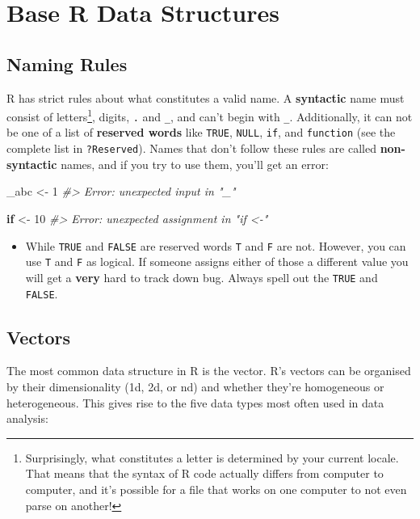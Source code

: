 \documentclass[]{book}
\newenvironment{Shaded}{\begin{snugshade}}{\end{snugshade}}
\newcommand{\DecValTok}[1]{\textcolor[rgb]{0.00,0.00,0.81}{#1}}
\newcommand{\StringTok}[1]{\textcolor[rgb]{0.31,0.60,0.02}{#1}}
\newcommand{\CommentTok}[1]{\textcolor[rgb]{0.56,0.35,0.01}{\textit{#1}}}
\newcommand{\ControlFlowTok}[1]{\textcolor[rgb]{0.13,0.29,0.53}{\textbf{#1}}}
\newcommand{\NormalTok}[1]{#1}
\let\rmarkdownfootnote\footnote%
\def\footnote{\protect\rmarkdownfootnote}
\newenvironment{rmdblock}[1]
  {\begin{shaded*}
  \begin{itemize}
  \renewcommand{\labelitemi}{
    \raisebox{-.7\height}[0pt][0pt]{
      {\setkeys{Gin}{width=3em,keepaspectratio}\texttt{[image: images/\#1]}}
    }
  }
  \item
  }
  {
  \end{itemize}
  \end{shaded*}
  }
\newenvironment{rmdwarning}
  {\begin{rmdblock}{warning}}
  {\end{rmdblock}}
\theoremstyle{definition}
\theoremstyle{definition}
\theoremstyle{definition}
\theoremstyle{remark}
\begin{document}
\chapter{Base R Data Structures}\label{base-r-data-structures}

\section{Naming Rules}\label{naming-rules}

R has strict rules about what constitutes a valid name. A
\textbf{syntactic} name must consist of letters\footnote{Surprisingly,
  what constitutes a letter is determined by your current locale. That
  means that the syntax of R code actually differs from computer to
  computer, and it's possible for a file that works on one computer to
  not even parse on another!}, digits, \texttt{.} and \texttt{\_}, and
can't begin with \texttt{\_}. Additionally, it can not be one of a list
of \textbf{reserved words} like \texttt{TRUE}, \texttt{NULL},
\texttt{if}, and \texttt{function} (see the complete list in
\texttt{?Reserved}). Names that don't follow these rules are called
\textbf{non-syntactic} names, and if you try to use them, you'll get an
error:

\begin{Shaded}
\begin{Highlighting}[]
\NormalTok{_abc <-}\StringTok{ }\DecValTok{1}
\CommentTok{#> Error: unexpected input in "_"}

\ControlFlowTok{if}\NormalTok{ <-}\StringTok{ }\DecValTok{10}
\CommentTok{#> Error: unexpected assignment in "if <-"}
\end{Highlighting}
\end{Shaded}

\begin{rmdwarning}
While \texttt{TRUE} and \texttt{FALSE} are reserved words \texttt{T} and
\texttt{F} are not. However, you can use \texttt{T} and \texttt{F} as
logical. If someone assigns either of those a different value you will
get a \textbf{very} hard to track down bug. Always spell out the
\texttt{TRUE} and \texttt{FALSE}.
\end{rmdwarning}

\section{Vectors}\label{vectors}

The most common data structure in R is the vector. R's vectors can be
organised by their dimensionality (1d, 2d, or nd) and whether they're
homogeneous or heterogeneous. This gives rise to the five data types
most often used in data analysis:
\end{document}
